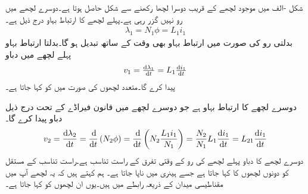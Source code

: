 شکل -الف میں موجود لچھے کے قریب دوسرا لچھا رکھنے سے شکل  حاصل ہوتا ہے۔دوسرے لچھے میں رو نہیں گزر رہی ہے۔پہلے لچھے  کا ارتباط بہاو درج ذیل ہے۔
\begin{align}
\lambda_1=N_1 \phi=L_1 i_1
\end{align}
بدلتی رو کی صورت میں ارتباط بہاو بھی وقت کے ساتھ تبدیل ہو گا۔بدلتا ارتباط بہاو پہلے لچھے میں دباو 
\begin{align}
v_1=\tfrac{\dif \lambda_1}{\dif t}=L_1 \tfrac{\dif i_1}{\dif t}
\end{align}
پیدا کرے گا۔متعدد لچھوں کی صورت میں  کو  کہا جاتا ہے۔

 دوسرے لچھے کا ارتباط بہاو  ہے جو دوسرے لچھے میں قانون فیراڈے کے تحت درج ذیل دباو پیدا کرے گا۔
\begin{align}
v_2=\frac{\dif \lambda_2}{\dif t}=\frac{\dif}{\dif t}\left(N_2 \phi\right)=\frac{\dif}{\dif t}\left(N_2 \frac{L_1 i_1}{N_1}\right)=\frac{N_2}{N_1} L_1 \frac{\dif i_1}{\dif t}=L_{21}\frac{\dif i_1}{\dif t}
\end{align}
دوسرے لچھے کا دباو پہلے لچھے کی رو کے وقتی تفرق کے راست تناسب ہے۔راست تناسب کے مستقل  کو دونوں لچھوں کا  کہا جاتا ہے جسے ہینری  میں ناپا جاتا ہے۔ ہم کہتے ہیں کہ یہ لچھے آپ میں مقناطیسی میدان کے ذریعہ رابطے میں ہیں۔یوں ان لچھوں کو  کہا جاتا ہے۔
